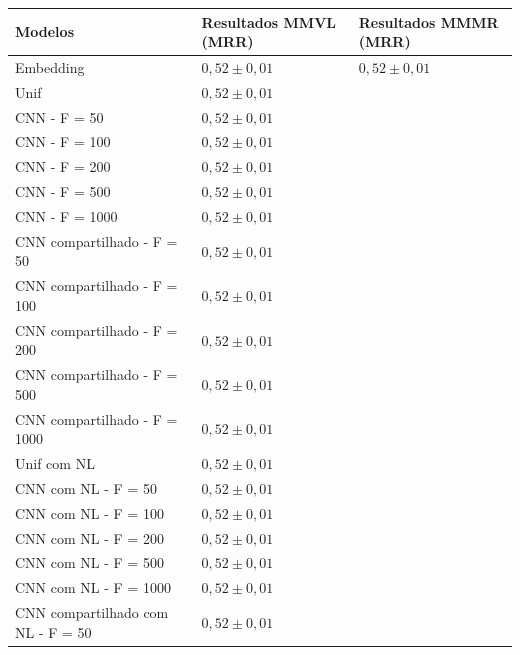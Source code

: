 \begin{table}[h]
\centering
\begin{tabular}{ p{10cm} P{3cm} P{3cm} }
 \hline
 \textbf{Modelos} & \textbf{Resultados MMVL (MRR)} & \textbf{Resultados MMMR (MRR)}\\
 \hline
 Embedding & $0,52 \pm 0,01$ & $0,52 \pm 0,01$\\
 
 Unif & $0,52 \pm 0,01$\\
 
 CNN - F = 50 & $0,52 \pm 0,01$\\
 
 CNN - F = 100 & $0,52 \pm 0,01$\\
 
 CNN - F = 200 & $0,52 \pm 0,01$\\
 
 CNN - F = 500 & $0,52 \pm 0,01$\\
 
 CNN - F = 1000 & $0,52 \pm 0,01$\\
 
 CNN compartilhado - F = 50 & $0,52 \pm 0,01$\\
 
 CNN compartilhado - F = 100 & $0,52 \pm 0,01$\\
 
 CNN compartilhado - F = 200 & $0,52 \pm 0,01$\\
 
 CNN compartilhado - F = 500 & $0,52 \pm 0,01$\\
 
 CNN compartilhado - F = 1000 & $0,52 \pm 0,01$\\
 
 
 \hline
 
 Unif com NL & $0,52 \pm 0,01$\\
 
 CNN com NL - F = 50 & $0,52 \pm 0,01$\\
 
 CNN com NL - F = 100 & $0,52 \pm 0,01$\\
 
 CNN com NL - F = 200 & $0,52 \pm 0,01$\\
 
 CNN com NL - F = 500 & $0,52 \pm 0,01$\\
 
 CNN com NL - F = 1000 & $0,52 \pm 0,01$\\
 
 CNN compartilhado com NL - F = 50 & $0,52 \pm 0,01$\\
 

\end{tabular}
\end{table}
